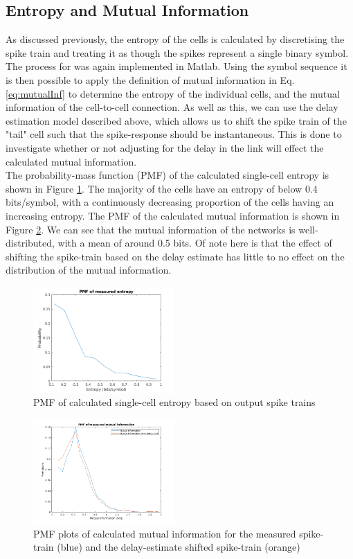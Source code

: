 \documentclass[letterpaper, 10 pt, conference]{ieeeconf}  %
\begin{document}
\subsection*{Entropy and Mutual Information}
As discussed previously, the entropy of the cells is calculated by discretising the spike train and treating it as though the spikes represent a single binary symbol. The process for was again implemented in Matlab. Using the symbol sequence it is then possible to apply the definition of mutual information in Eq. \ref{eq:mutualInf} to determine the entropy of the individual cells, and the mutual information of the cell-to-cell connection. As well as this, we can use the delay estimation model described above, which allows us to shift the spike train of the "tail" cell such that the spike-response should be instantaneous. This is done to investigate whether or not adjusting for the delay in the link will effect the calculated mutual information.\\
The probability-mass function (PMF) of the calculated single-cell entropy is shown in Figure \ref{fig:cellEntPmf}. The majority of the cells have an entropy of below 0.4 bits/symbol, with a continuously decreasing proportion of the cells having an increasing entropy. The PMF of the calculated mutual information is shown in Figure \ref{fig:mutualInfoPmf}. We can see that the mutual information of the networks is well-distributed, with a mean of around 0.5 bits. Of note here is that the effect of shifting the spike-train based on the delay estimate has little to no effect on the distribution of the mutual information. \\

\begin{figure}[ht]
    \includegraphics[width=0.48\textwidth]{entropyPmf.png}
    \caption{PMF of calculated single-cell entropy based on output spike trains}
    \label{fig:cellEntPmf}
\end{figure}

\begin{figure}[ht]
    \includegraphics[width=0.48\textwidth]{mutualInfo_pmf.png}
    \caption{PMF plots of calculated mutual information for the measured spike-train (blue) and the delay-estimate shifted spike-train (orange)}
    \label{fig:mutualInfoPmf}
\end{figure}
\end{document}
